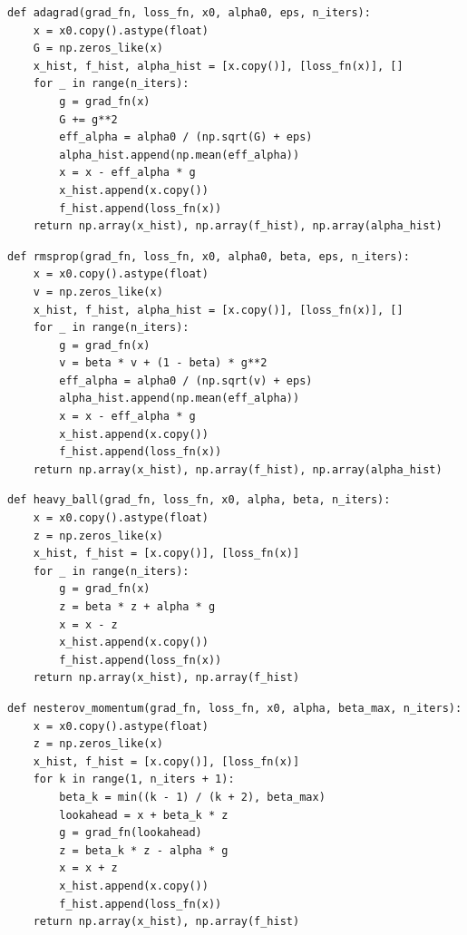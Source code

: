 \documentclass[11pt,a4paper]{article}
\begin{document}
\begin{lstlisting}[caption={Adagrad}]
def adagrad(grad_fn, loss_fn, x0, alpha0, eps, n_iters):
    x = x0.copy().astype(float)
    G = np.zeros_like(x)
    x_hist, f_hist, alpha_hist = [x.copy()], [loss_fn(x)], []
    for _ in range(n_iters):
        g = grad_fn(x)
        G += g**2
        eff_alpha = alpha0 / (np.sqrt(G) + eps)
        alpha_hist.append(np.mean(eff_alpha))
        x = x - eff_alpha * g
        x_hist.append(x.copy())
        f_hist.append(loss_fn(x))
    return np.array(x_hist), np.array(f_hist), np.array(alpha_hist)
\end{lstlisting}

\begin{lstlisting}[caption={RMSprop}]
def rmsprop(grad_fn, loss_fn, x0, alpha0, beta, eps, n_iters):
    x = x0.copy().astype(float)
    v = np.zeros_like(x)
    x_hist, f_hist, alpha_hist = [x.copy()], [loss_fn(x)], []
    for _ in range(n_iters):
        g = grad_fn(x)
        v = beta * v + (1 - beta) * g**2
        eff_alpha = alpha0 / (np.sqrt(v) + eps)
        alpha_hist.append(np.mean(eff_alpha))
        x = x - eff_alpha * g
        x_hist.append(x.copy())
        f_hist.append(loss_fn(x))
    return np.array(x_hist), np.array(f_hist), np.array(alpha_hist)
\end{lstlisting}

\begin{lstlisting}[caption={Heavy Ball / Polyak Momentum}]
def heavy_ball(grad_fn, loss_fn, x0, alpha, beta, n_iters):
    x = x0.copy().astype(float)
    z = np.zeros_like(x)
    x_hist, f_hist = [x.copy()], [loss_fn(x)]
    for _ in range(n_iters):
        g = grad_fn(x)
        z = beta * z + alpha * g
        x = x - z
        x_hist.append(x.copy())
        f_hist.append(loss_fn(x))
    return np.array(x_hist), np.array(f_hist)
\end{lstlisting}

\begin{lstlisting}[caption={Nesterov Momentum}]
def nesterov_momentum(grad_fn, loss_fn, x0, alpha, beta_max, n_iters):
    x = x0.copy().astype(float)
    z = np.zeros_like(x)
    x_hist, f_hist = [x.copy()], [loss_fn(x)]
    for k in range(1, n_iters + 1):
        beta_k = min((k - 1) / (k + 2), beta_max)
        lookahead = x + beta_k * z
        g = grad_fn(lookahead)
        z = beta_k * z - alpha * g
        x = x + z
        x_hist.append(x.copy())
        f_hist.append(loss_fn(x))
    return np.array(x_hist), np.array(f_hist)
\end{lstlisting}
\end{document}
